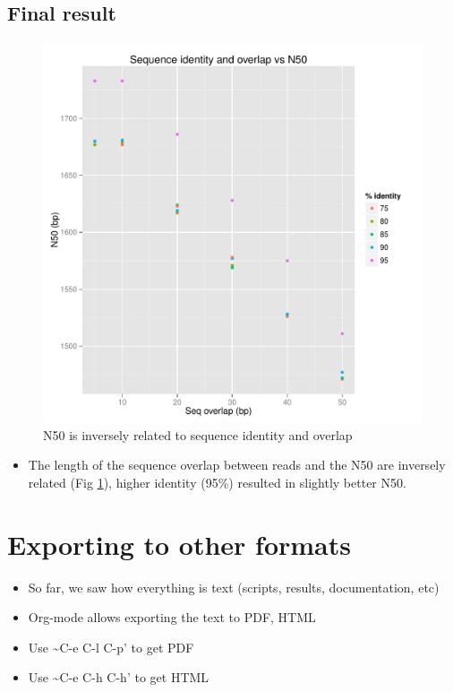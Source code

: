 \documentclass[a4paper, twoside]{article}
\begin{document}
\subsection{Final result}
\label{sec:org596e795}
\begin{figure}[htb]
\centering
\includegraphics[width=.9\linewidth]{./n50_ovlgth.pdf}
\caption{\label{fig:org7b0ff08}
N50 is inversely related to sequence identity and overlap}
\end{figure}

\begin{itemize}
\item The length of the sequence overlap between reads and the N50 are
inversely related (Fig \ref{fig:org7b0ff08}), higher identity (95\%) resulted in
slightly better N50.
\end{itemize}

\section{Exporting to other formats}
\label{sec:org588133e}
\begin{itemize}
\item So far, we saw how everything is text (scripts, results,
documentation, etc)
\item Org-mode allows exporting the text to PDF, HTML
\item Use \textasciitilde{}C-e C-l C-p' to get PDF
\item Use \textasciitilde{}C-e C-h C-h' to get HTML
\end{itemize}
\end{document}
